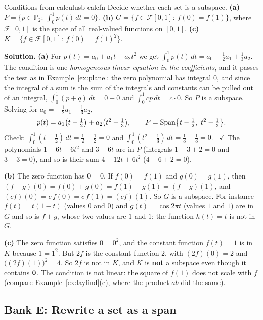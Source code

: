 \documentclass[11pt]{article}
\begin{document}
\begin{exmp}{Conditions from calculus}{b-calcfn}
Decide whether each set is a subspace. \textbf{(a)} $P=\{p\in\mathbb{P}_2:\ \int_0^1p(t)\,dt=0\}$. \textbf{(b)} $G=\{f\in\mathcal{F}[0,1]:\ f(0)=f(1)\}$, where $\mathcal{F}[0,1]$ is the space of all real-valued functions on $[0,1]$. \textbf{(c)} $K=\{f\in\mathcal{F}[0,1]:\ f(0)=f(1)^2\}$.

\textbf{Solution.} \textbf{(a)} For $p(t)=a_0+a_1t+a_2t^2$ we get $\int_0^1p(t)\,dt=a_0+\tfrac12a_1+\tfrac13a_2$. The condition is one \emph{homogeneous linear equation in the coefficients}, and it passes the test as in Example~\ref{ex:plane}: the zero polynomial has integral $0$, and since the integral of a sum is the sum of the integrals and constants can be pulled out of an integral, $\int_0^1(p+q)\,dt=0+0$ and $\int_0^1cp\,dt=c\cdot0$. So $P$ is a subspace. Solving for $a_0=-\tfrac12a_1-\tfrac13a_2$,
\[
p(t)=a_1\bigl(t-\tfrac12\bigr)+a_2\bigl(t^2-\tfrac13\bigr),\qquad P=\operatorname{Span}\bigl\{t-\tfrac12,\ t^2-\tfrac13\bigr\}.
\]
Check: $\int_0^1(t-\tfrac12)\,dt=\tfrac12-\tfrac12=0$ and $\int_0^1(t^2-\tfrac13)\,dt=\tfrac13-\tfrac13=0$. \ $\checkmark$ The polynomials $1-6t+6t^2$ and $3-6t$ are in $P$ (integrals $1-3+2=0$ and $3-3=0$), and so is their sum $4-12t+6t^2$ ($4-6+2=0$).

\textbf{(b)} The zero function has $0=0$. If $f(0)=f(1)$ and $g(0)=g(1)$, then $(f+g)(0)=f(0)+g(0)=f(1)+g(1)=(f+g)(1)$, and $(cf)(0)=c\,f(0)=c\,f(1)=(cf)(1)$. So $G$ is a subspace. For instance $f(t)=t(1-t)$ (values $0$ and $0$) and $g(t)=\cos2\pi t$ (values $1$ and $1$) are in $G$ and so is $f+g$, whose two values are $1$ and $1$; the function $h(t)=t$ is not in $G$.

\textbf{(c)} The zero function satisfies $0=0^2$, and the constant function $f(t)=1$ is in $K$ because $1=1^2$. But $2f$ is the constant function $2$, with $(2f)(0)=2$ and $\bigl((2f)(1)\bigr)^2=4$. So $2f$ is not in $K$, and $K$ is \textbf{not} a subspace even though it contains $\mathbf{0}$. The condition is not linear: the square of $f(1)$ does not scale with $f$ (compare Example~\ref{ex:layfind}(c), where the product $ab$ did the same).
\end{exmp}

\subsection*{Bank E: Rewrite a set as a span}
\end{document}
